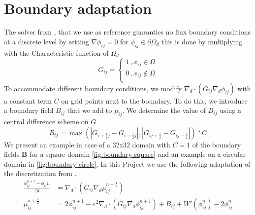 \documentclass{mimosis}
\begin{document}
\chapter{Boundary adaptation}
\label{sec:org59ad0b4}
The solver from \autocite{SHIN20117441}, that we use as reference guaranties no flux boundary conditions at a discrete level by setting \(\nabla \phi_{ij} = 0\) for \(\phi_{ij} \in \partial \Omega_{d}\) this is done by multiplying with the Characteristic function of \(\Omega_{d}\)
\begin{equation}
G_{ij}=
\begin{cases}
1 \,, x_{ij} \in \Omega \\
0 \,, x_{ij} \not\in \Omega \\
\end{cases}
\end{equation}
To accommodate different boundary conditions, we modify \(\nabla_d \cdot (G_{ij} \nabla_d \phi_{ij})\) with a constant term \(C\) on grid points next to the boundary. To do this, we introduce a boundary field \(B_{ij}\) that we add to \(\mu_{ij}\). We determine the value of \(B_{ij}\) using a central difference scheme on \(G\)
\begin{equation}
B_{ij} = \max\left(  |G_{i+\frac{1}{2}j} - G_{i-\frac{1}{2}j}| , |G_{ij+\frac{1}{2}} - G_{ij-\frac{1}{2}}|\right) * C
\end{equation}
We present an example in case of a 32x32 domain with \(C=1\) of the boundary fields \(\mathbf{B}\) for a square domain \ref{fig:boundary-square} and an example on a circular domain in \ref{fig:boundary-circle}.
In this Project we use the following adaptation of the discretization from \autocite{SHIN20117441}.
\begin{equation}
\label{eq:second-order-adapted-ansatz}
\begin{aligned}
\frac{\phi_{ij}^{n+1} - \phi_{ij}n}{\Delta t}  &=  \nabla _d \cdot (G_{ij} \nabla_d \mu_{ij}^{n+\frac{1}{2}} )  \\
 \mu_{ij}^{n+\frac{1}{2}} &= 2\phi_{ij}^{n+1} - \varepsilon^2  \nabla_d \cdot  (G_{ij} \nabla _d \phi_{ij}^{n+1} ) + B_{ij} + W'(\phi_{ij}^n) - 2\phi _{ij}^n
\end{aligned}
\end{equation}
\end{document}

